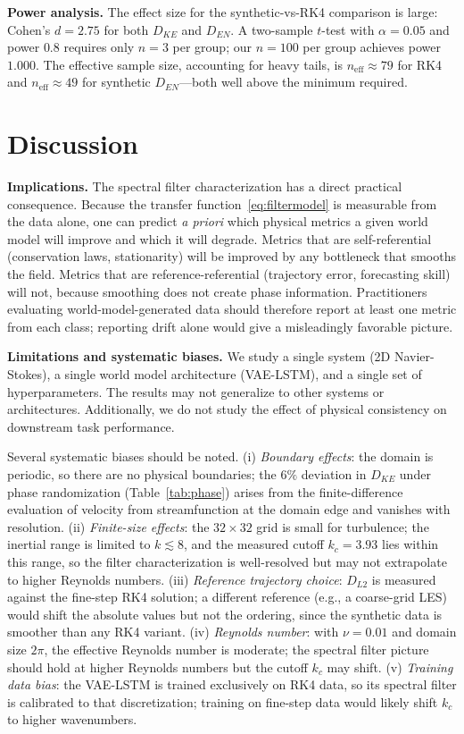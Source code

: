 \documentclass[reprint,aps,pre]{revtex4-2}
\begin{document}
\textbf{Power analysis.} The effect size for the synthetic-vs-RK4 comparison is large: Cohen's $d = 2.75$ for both $D_{KE}$ and $D_{EN}$. A two-sample $t$-test with $\alpha = 0.05$ and power $0.8$ requires only $n = 3$ per group; our $n = 100$ per group achieves power $1.000$. The effective sample size, accounting for heavy tails, is $n_{\text{eff}} \approx 79$ for RK4 and $n_{\text{eff}} \approx 49$ for synthetic $D_{EN}$---both well above the minimum required.

\section{Discussion}

\textbf{Implications.} The spectral filter characterization has a direct practical consequence. Because the transfer function~\eqref{eq:filtermodel} is measurable from the data alone, one can predict \textit{a priori} which physical metrics a given world model will improve and which it will degrade. Metrics that are self-referential (conservation laws, stationarity) will be improved by any bottleneck that smooths the field. Metrics that are reference-referential (trajectory error, forecasting skill) will not, because smoothing does not create phase information. Practitioners evaluating world-model-generated data should therefore report at least one metric from each class; reporting drift alone would give a misleadingly favorable picture.

\textbf{Limitations and systematic biases.} We study a single system (2D Navier-Stokes), a single world model architecture (VAE-LSTM), and a single set of hyperparameters. The results may not generalize to other systems or architectures. Additionally, we do not study the effect of physical consistency on downstream task performance.

Several systematic biases should be noted. (i) \textit{Boundary effects}: the domain is periodic, so there are no physical boundaries; the $6\%$ deviation in $D_{KE}$ under phase randomization (Table~\ref{tab:phase}) arises from the finite-difference evaluation of velocity from streamfunction at the domain edge and vanishes with resolution. (ii) \textit{Finite-size effects}: the $32\times32$ grid is small for turbulence; the inertial range is limited to $k\lesssim8$, and the measured cutoff $k_c=3.93$ lies within this range, so the filter characterization is well-resolved but may not extrapolate to higher Reynolds numbers. (iii) \textit{Reference trajectory choice}: $D_{L2}$ is measured against the fine-step RK4 solution; a different reference (e.g., a coarse-grid LES) would shift the absolute values but not the ordering, since the synthetic data is smoother than any RK4 variant. (iv) \textit{Reynolds number}: with $\nu=0.01$ and domain size $2\pi$, the effective Reynolds number is moderate; the spectral filter picture should hold at higher Reynolds numbers but the cutoff $k_c$ may shift. (v) \textit{Training data bias}: the VAE-LSTM is trained exclusively on RK4 data, so its spectral filter is calibrated to that discretization; training on fine-step data would likely shift $k_c$ to higher wavenumbers.
\end{document}
